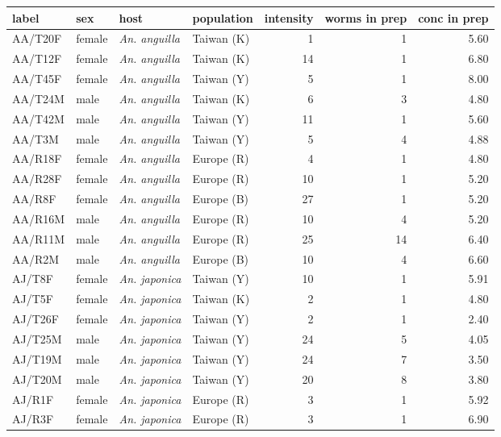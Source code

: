 \begin{table}[h]
\begin{center}
\begin{tabular}{llllrrr}
  \hline
  label & sex & host & population & intensity & worms in prep & conc in prep \\ 
  \hline
  AA/T20F & female & \textit{An. anguilla} & Taiwan (K) & 1 & 1 & 5.60 \\ 
  AA/T12F & female & \textit{An. anguilla} & Taiwan (K) & 14 & 1 & 6.80 \\ 
  AA/T45F & female & \textit{An. anguilla} & Taiwan (Y) & 5 & 1 & 8.00 \\ 
  AA/T24M & male & \textit{An. anguilla} & Taiwan (K) & 6 & 3 & 4.80 \\ 
  AA/T42M & male & \textit{An. anguilla} & Taiwan (Y) & 11 & 1 & 5.60 \\ 
  AA/T3M & male & \textit{An. anguilla} & Taiwan (Y) & 5 & 4 & 4.88 \\ 
  AA/R18F & female & \textit{An. anguilla} & Europe (R) & 4 & 1 & 4.80 \\ 
  AA/R28F & female & \textit{An. anguilla} & Europe (R) & 10 & 1 & 5.20 \\ 
  AA/R8F & female & \textit{An. anguilla} & Europe (B) & 27 & 1 & 5.20 \\ 
  AA/R16M & male & \textit{An. anguilla} & Europe (R) & 10 & 4 & 5.20 \\ 
  AA/R11M & male & \textit{An. anguilla} & Europe (R) & 25 & 14 & 6.40 \\ 
  AA/R2M & male & \textit{An. anguilla} & Europe (B) & 10 & 4 & 6.60 \\ 
  AJ/T8F & female & \textit{An. japonica} & Taiwan (Y) & 10 & 1 & 5.91 \\ 
  AJ/T5F & female & \textit{An. japonica} & Taiwan (K) & 2 & 1 & 4.80 \\ 
  AJ/T26F & female & \textit{An. japonica} & Taiwan (Y) & 2 & 1 & 2.40 \\ 
  AJ/T25M & male & \textit{An. japonica} & Taiwan (Y) & 24 & 5 & 4.05 \\ 
  AJ/T19M & male & \textit{An. japonica} & Taiwan (Y) & 24 & 7 & 3.50 \\ 
  AJ/T20M & male & \textit{An. japonica} & Taiwan (Y) & 20 & 8 & 3.80 \\ 
  AJ/R1F & female & \textit{An. japonica} & Europe (R) & 3 & 1 & 5.92 \\ 
  AJ/R3F & female & \textit{An. japonica} & Europe (R) & 3 & 1 & 6.90 \\ 

\end{tabular}
\end{center}
\end{table}

